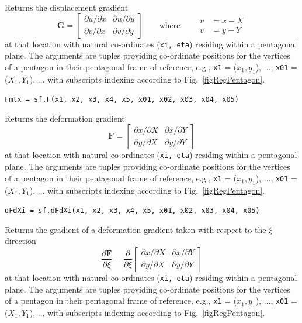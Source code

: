 \medskip\noindent
Returns the displacement gradient 
\begin{displaymath}
   \mathbf{G} = \begin{bmatrix}
        \partial u / \partial x & \partial u / \partial y \\
        \partial v / \partial x & \partial v / \partial y 
   \end{bmatrix}
   \qquad \text{where} \qquad
   \begin{aligned}
        u & = x - X \\
        v & = y - Y
   \end{aligned}
\end{displaymath}
at that location with natural co-ordinates (\texttt{xi, eta}) residing within a pentagonal plane.  The arguments are tuples providing co-ordinate positions for the vertices of a pentagon in their pentagonal frame of reference, e.g., \texttt{x1} = ($x_1, y_1$), $\ldots$, \texttt{x01} = ($X_1, Y_1$), $\ldots$ with subscripts indexing according to Fig.~\ref{figRegPentagon}.

\medskip\noindent
\texttt{Fmtx = sf.F(x1, x2, x3, x4, x5, x01, x02, x03, x04, x05)}

\medskip\noindent
Returns the deformation gradient 
\begin{displaymath}
\mathbf{F} = \begin{bmatrix}
\partial x / \partial X & \partial x / \partial Y \\
\partial y / \partial X & \partial y / \partial Y 
\end{bmatrix}
\end{displaymath}
at that location with natural co-ordinates (\texttt{xi, eta}) residing within a pentagonal plane.  The arguments are tuples providing co-ordinate positions for the vertices of a pentagon in their pentagonal frame of reference, e.g., \texttt{x1} = ($x_1, y_1$), $\ldots$, \texttt{x01} = ($X_1, Y_1$), $\ldots$ with subscripts indexing according to Fig.~\ref{figRegPentagon}.

\medskip\noindent
\texttt{dFdXi = sf.dFdXi(x1, x2, x3, x4, x5, x01, x02, x03, x04, x05)}

\medskip\noindent
Returns the gradient of a deformation gradient taken with respect to the $\xi$ direction 
\begin{displaymath}
\frac{\partial\mathbf{F}}{\partial \xi} = \frac{\partial}{\partial \xi} 
\begin{bmatrix}
\partial x / \partial X & \partial x / \partial Y \\
\partial y / \partial X & \partial y / \partial Y 
\end{bmatrix}
\end{displaymath}
at that location with natural co-ordinates (\texttt{xi, eta}) residing within a pentagonal plane.  The arguments are tuples providing co-ordinate positions for the vertices of a pentagon in their pentagonal frame of reference, e.g., \texttt{x1} = ($x_1, y_1$), $\ldots$, \texttt{x01} = ($X_1, Y_1$), $\ldots$ with subscripts indexing according to Fig.~\ref{figRegPentagon}.

